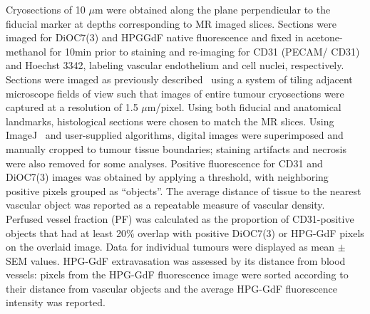 Cryosections of 10 $\mu$m were obtained along the plane perpendicular to the fiducial marker at depths corresponding to MR imaged slices.
Sections were imaged for DiOC7(3) and HPGGdF native fluorescence and fixed in acetone-methanol for 10min prior to staining and re-imaging for CD31 (PECAM/ CD31) and Hoechst 3342, labeling vascular endothelium and cell nuclei, respectively.
Sections were imaged as previously described~\cite{Kyle:2007ch} using a system of tiling adjacent microscope fields of view such that images of entire tumour cryosections were captured at a resolution of 1.5 $\mu$m/pixel.
Using both fiducial and anatomical landmarks, histological sections were chosen to match the MR slices.
Using ImageJ~\cite{Collins:2007jr} and user-supplied algorithms, digital images were superimposed and manually cropped to tumour tissue boundaries; staining artifacts and necrosis were also removed for some analyses.
Positive fluorescence for CD31 and DiOC7(3) images was obtained by applying a threshold, with neighboring positive pixels grouped as ``objects''.
The average distance of tissue to the nearest vascular object was reported as a repeatable measure of vascular density.
Perfused vessel fraction (PF) was calculated as the proportion of CD31-positive objects that had at least 20\% overlap with positive DiOC7(3) or \ac{HPG-GdF} pixels on the overlaid image.
Data for individual tumours were displayed as mean $\pm$ SEM values.
HPG-GdF extravasation was assessed by its distance from blood vessels: pixels from the \ac{HPG-GdF} fluorescence image were sorted according to their distance from vascular objects and the average \ac{HPG-GdF} fluorescence intensity was reported.

